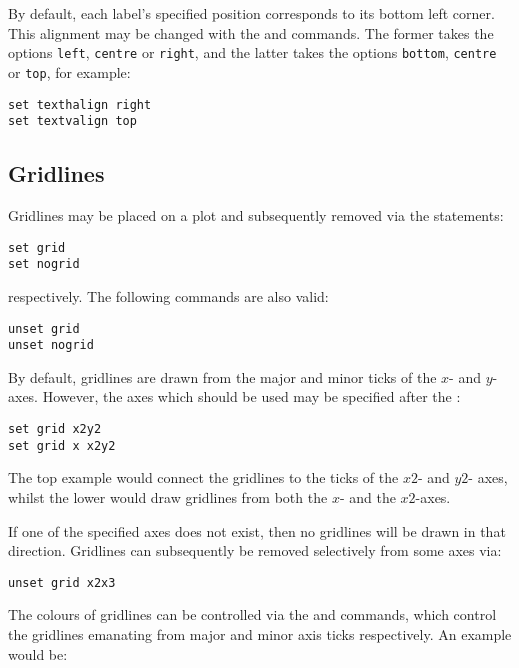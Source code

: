 By default, each label's specified
position corresponds to its bottom left corner. This alignment may be changed
with the  and  commands. The
former takes the options {\tt left}, {\tt centre} or {\tt right}, and the
latter takes the options {\tt bottom}, {\tt centre} or {\tt top}, for example:

\begin{verbatim}
set texthalign right
set textvalign top
\end{verbatim}

\subsection{Gridlines}

Gridlines may be placed on a plot and subsequently removed via the statements:

\begin{verbatim}
set grid
set nogrid
\end{verbatim}

\noindent respectively. The following commands are also valid:

\begin{verbatim}
unset grid
unset nogrid
\end{verbatim}

\noindent By default, gridlines are drawn from the major and minor ticks of the
$x$- and $y$-axes. However, the axes which should be used may be specified
after the :

\begin{verbatim}
set grid x2y2
set grid x x2y2
\end{verbatim}

\noindent The top example would connect the gridlines to the ticks of the $x2$-
and $y2$- axes, whilst the lower would draw gridlines from both the $x$- and
the $x2$-axes.

If one of the specified axes does not exist, then no gridlines will be drawn in
that direction.  Gridlines can subsequently be removed selectively from some
axes via:

\begin{verbatim}
unset grid x2x3
\end{verbatim}

The colours of gridlines can be
controlled via the  and  commands, which control the gridlines emanating from major and
minor axis ticks respectively. An example would be:

